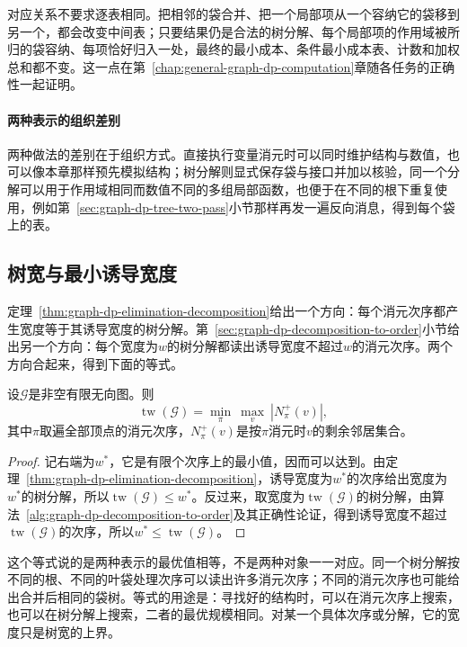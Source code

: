 对应关系不要求逐表相同。把相邻的袋合并、把一个局部项从一个容纳它的袋移到另一个，都会改变中间表；只要结果仍是合法的树分解、每个局部项的作用域被所归的袋容纳、每项恰好归入一处，最终的最小成本、条件最小成本表、计数和加权总和都不变。这一点在第~\ref{chap:general-graph-dp-computation}章随各任务的正确性一起证明。

\paragraph{两种表示的组织差别}
两种做法的差别在于组织方式。直接执行变量消元时可以同时维护结构与数值，也可以像本章那样预先模拟结构；树分解则显式保存袋与接口并加以核验，同一个分解可以用于作用域相同而数值不同的多组局部函数，也便于在不同的根下重复使用，例如第~\ref{sec:graph-dp-tree-two-pass}小节那样再发一遍反向消息，得到每个袋上的表。

\subsection{树宽与最小诱导宽度}
\label{sec:graph-dp-treewidth-induced-width}

定理~\ref{thm:graph-dp-elimination-decomposition}给出一个方向：每个消元次序都产生宽度等于其诱导宽度的树分解。第~\ref{sec:graph-dp-decomposition-to-order}小节给出另一个方向：每个宽度为$w$的树分解都读出诱导宽度不超过$w$的消元次序。两个方向合起来，得到下面的等式。

\begin{theorem}[树宽等于最小诱导宽度]
\label{thm:graph-dp-treewidth-induced-width}
设$\mathcal G$是非空有限无向图。则
\[
\operatorname{tw}(\mathcal G)=\min_{\pi}\ \max_{v}\ |N^+_\pi(v)|,
\]
其中$\pi$取遍全部顶点的消元次序，$N^+_\pi(v)$是按$\pi$消元时$v$的剩余邻居集合。
\end{theorem}

\begin{proof}
记右端为$w^\ast$，它是有限个次序上的最小值，因而可以达到。由定理~\ref{thm:graph-dp-elimination-decomposition}，诱导宽度为$w^\ast$的次序给出宽度为$w^\ast$的树分解，所以$\operatorname{tw}(\mathcal G)\leq w^\ast$。反过来，取宽度为$\operatorname{tw}(\mathcal G)$的树分解，由算法~\ref{alg:graph-dp-decomposition-to-order}及其正确性论证，得到诱导宽度不超过$\operatorname{tw}(\mathcal G)$的次序，所以$w^\ast\leq\operatorname{tw}(\mathcal G)$。
\end{proof}

这个等式说的是两种表示的最优值相等，不是两种对象一一对应。同一个树分解按不同的根、不同的叶袋处理次序可以读出许多消元次序；不同的消元次序也可能给出合并后相同的袋树。等式的用途是：寻找好的结构时，可以在消元次序上搜索，也可以在树分解上搜索，二者的最优规模相同。对某一个具体次序或分解，它的宽度只是树宽的上界。

